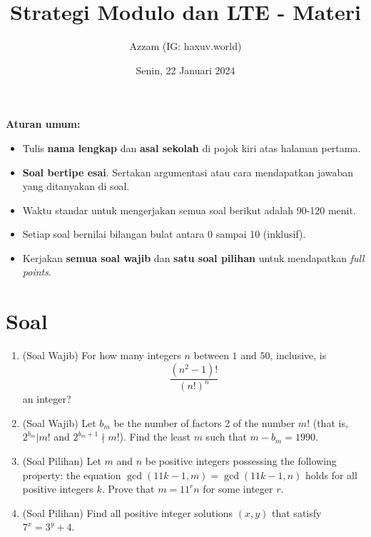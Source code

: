 \documentclass[11pt]{scrartcl}
\title{Strategi Modulo dan LTE - Materi}
\author{Azzam (IG: haxuv.world)}
\date{Senin, 22 Januari 2024}
\begin{document}
\maketitle
\textbf{Aturan umum:}
\begin{itemize}
    \item Tulis \textbf{nama lengkap} dan \textbf{asal sekolah} di pojok kiri atas halaman pertama.
    \item \textbf{Soal bertipe esai}. Sertakan argumentasi atau cara mendapatkan jawaban yang ditanyakan di soal.
    \item Waktu standar untuk mengerjakan semua soal berikut adalah 90-120 menit.
    \item Setiap soal bernilai bilangan bulat antara 0 sampai 10 (inklusif).
    \item Kerjakan \textbf{semua soal wajib} dan \textbf{satu soal pilihan} untuk mendapatkan \textit{full points}.
\end{itemize}


\section{Soal}
\begin{enumerate}
    \item (Soal Wajib) For how many integers $n$ between $1$ and $50$, inclusive, is\[\frac{(n^2-1)!}{(n!)^n}\]an integer?

    \item (Soal Wajib) Let $b_m$ be the number of factors 2 of the number $m!$ (that is, $2^{b_m}|m!$ and $2^{b_m+1} \nmid m!$). Find the least $m$ such that $m - b_m = 1990$.
    
    \item (Soal Pilihan) Let $m$ and $n$ be positive integers possessing the following property: the equation $\gcd(11k - 1, m) = \gcd(11k - 1, n)$ holds for all positive integers $k$. Prove that $m = 11^{r}n$ for some integer $r$.
    
    \item (Soal Pilihan) Find all positive integer solutions $(x,y)$ that satisfy $7^x=3^y+4$.
\end{enumerate}
\end{document}
